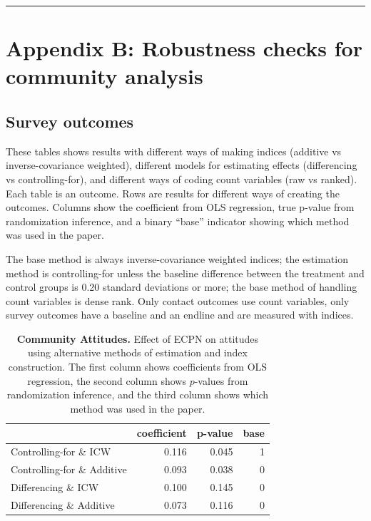 \documentclass[
]{article}
\begin{document}
\begin{center}\rule{0.5\linewidth}{0.5pt}\end{center}

\newpage

\hypertarget{appendix-b-robustness-checks-for-community-analysis}{%
\section{Appendix B: Robustness checks for community
analysis}\label{appendix-b-robustness-checks-for-community-analysis}}

\hypertarget{survey-outcomes}{%
\subsection{Survey outcomes}\label{survey-outcomes}}

These tables shows results with different ways of making indices
(additive vs inverse-covariance weighted), different models for
estimating effects (differencing vs controlling-for), and different ways
of coding count variables (raw vs ranked). Each table is an outcome.
Rows are results for different ways of creating the outcomes. Columns
show the coefficient from OLS regression, true p-value from
randomization inference, and a binary ``base'' indicator showing which
method was used in the paper.

The base method is always inverse-covariance weighted indices; the
estimation method is controlling-for unless the baseline difference
between the treatment and control groups is 0.20 standard deviations or
more; the base method of handling count variables is dense rank. Only
contact outcomes use count variables, only survey outcomes have a
baseline and an endline and are measured with indices.

\begin{table}[H]
\begin{center}
\label{tab:attitude_tab}
\caption{\textbf{Community Attitudes.} Effect of ECPN on attitudes using alternative methods of estimation and index construction. The first column shows coefficients from OLS regression, the second column shows $p$-values from randomization inference, and the third column shows which method was used in the paper.}
\smallskip

\begin{tabular}{l|r|r|r}
\hline
  & coefficient & p-value & base\\
\hline
Controlling-for \& ICW & 0.116 & 0.045 & 1\\
\hline
Controlling-for \& Additive & 0.093 & 0.038 & 0\\
\hline
Differencing \& ICW & 0.100 & 0.145 & 0\\
\hline
Differencing \& Additive & 0.073 & 0.116 & 0\\
\hline
\end{tabular}


\end{center}
\end{table}
\end{document}
